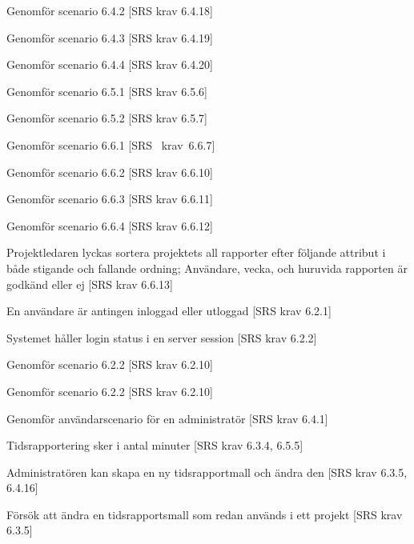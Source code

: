 \documentclass[a4paper]{article}
\begin{document}
\begin{appendices}
\begin{ST}
\item
Genomför scenario 6.4.2 [SRS krav 6.4.18]

\item
Genomför scenario 6.4.3 [SRS krav 6.4.19]

\item
Genomför scenario 6.4.4 [SRS krav 6.4.20]

\item
Genomför scenario 6.5.1 [SRS krav 6.5.6]

\item
Genomför scenario 6.5.2 [SRS krav 6.5.7]

\item
Genomför scenario 6.6.1 [SRS~ krav~6.6.7]

\item
Genomför scenario 6.6.2 [SRS krav 6.6.10]

\item
Genomför scenario 6.6.3 [SRS krav 6.6.11]

\item
Genomför scenario 6.6.4 [SRS krav 6.6.12]

\item
Projektledaren lyckas sortera projektets all rapporter efter följande attribut i både stigande och fallande ordning; Användare, vecka, och huruvida rapporten är godkänd eller ej [SRS krav 6.6.13]


\item
En användare är antingen inloggad eller utloggad [SRS krav 6.2.1]

\item
Systemet håller login status i en server session [SRS krav 6.2.2]

\item
Genomför scenario 6.2.2 [SRS krav 6.2.10]

\item
Genomför scenario 6.2.2 [SRS krav 6.2.10]

\item
Genomför användarscenario för en administratör [SRS krav 6.4.1]

\item
Tidsrapportering sker i antal minuter [SRS krav 6.3.4, 6.5.5]

\item
Administratören kan skapa en ny tidsrapportmall och ändra den [SRS krav 6.3.5, 6.4.16]

\item
Försök att ändra en tidsrapportsmall som redan används i ett projekt [SRS krav 6.3.5]


\end{ST}
\end{appendices}
\end{document}
